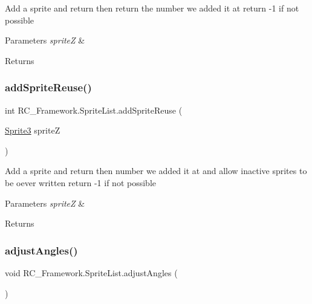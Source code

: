 Add a sprite and return then return the number we added it at return -\/1 if not possible 


\begin{DoxyParams}{Parameters}
{\em spriteZ} & \\
\hline
\end{DoxyParams}
\begin{DoxyReturn}{Returns}

\end{DoxyReturn}
\mbox{\label{class_r_c___framework_1_1_sprite_list_a0ff2817bd891443dd588b37aad792cf0}} 
\subsubsection{\texorpdfstring{add\+Sprite\+Reuse()}{addSpriteReuse()}}
{\footnotesize\ttfamily int R\+C\+\_\+\+Framework.\+Sprite\+List.\+add\+Sprite\+Reuse (\begin{DoxyParamCaption}\item[{\mbox{\hyperlink{class_r_c___framework_1_1_sprite3}{Sprite3}}}]{spriteZ }\end{DoxyParamCaption})}



Add a sprite and return then number we added it at and allow inactive sprites to be oever written return -\/1 if not possible 


\begin{DoxyParams}{Parameters}
{\em spriteZ} & \\
\hline
\end{DoxyParams}
\begin{DoxyReturn}{Returns}

\end{DoxyReturn}
\mbox{\label{class_r_c___framework_1_1_sprite_list_a91c1c36f7a1b321e6a1351fddd9c7e3e}} 
\subsubsection{\texorpdfstring{adjust\+Angles()}{adjustAngles()}}
{\footnotesize\ttfamily void R\+C\+\_\+\+Framework.\+Sprite\+List.\+adjust\+Angles (\begin{DoxyParamCaption}{ }\end{DoxyParamCaption})}




